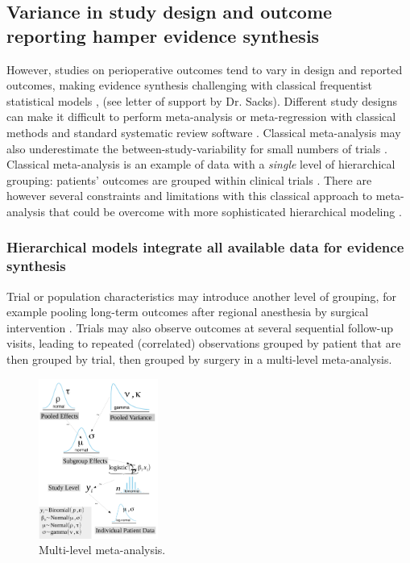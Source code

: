\documentclass[11pt,notitlepage]{article}
\begin{document}
\subsection*{Variance in study design and outcome reporting hamper evidence synthesis}
However, studies on perioperative outcomes tend to vary in design and reported outcomes\cite{Andreae2013}, making 
evidence synthesis challenging with classical frequentist statistical models \cite{Spiegelhalter_11134920}, (see 
letter of support by Dr. Sacks). Different study designs can make it difficult to perform meta-analysis or meta-regression 
with classical methods and standard systematic review software \cite{Deeks2011chapter}. Classical meta-analysis may also 
underestimate the between-study-variability for small numbers of trials \cite{Andreae2015,Song2012,Cornell2014}. 
Classical meta-analysis is an example of data with a \textit{single} level of hierarchical grouping: patients' 
outcomes are grouped within clinical trials \cite{egger2008systematic}. There are however several constraints and limitations 
with this classical approach to meta-analysis that could be overcome with more sophisticated hierarchical modeling  
\cite{Andreae2015,Thompson2002,Abroug2011}.

\subsubsection*{Hierarchical models integrate all available data for evidence synthesis}

Trial or population characteristics may introduce another level of grouping, for example pooling long-term outcomes 
after regional anesthesia by surgical intervention \cite{Andreae2013,Abroug2011}. Trials may also observe outcomes at several 
sequential follow-up visits, leading to repeated (correlated) observations grouped by patient that are then grouped by trial, then grouped by surgery in a multi-level meta-analysis.

\begin{figure} 
 \vspace*{-14pt}
  \includegraphics[width=0.35\textwidth]{Figures/DistrogramMultiLevelMetaAnalysis.pdf} 
 \caption{Multi-level meta-analysis.}
 \vspace{-10pt}
 \label{fig:MetaAnalysis}
 \vspace*{-10pt}
\end{figure}
\end{document}
